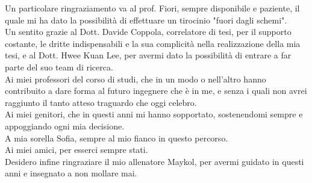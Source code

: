 \documentclass[a4print,english,lof,lot,twoside]{univpmthesis}
\begin{document}
 

\frontmatter

\maketitle

\begin{thesisacknowledge}[italian]Un particolare ringraziamento va al prof. Fiori, sempre disponibile e paziente, il quale mi ha dato la possibilità di effettuare un tirocinio "fuori dagli schemi". \\
Un sentito grazie al Dott. Davide Coppola, correlatore di tesi, per il supporto costante, le dritte indispensabili e la sua complicità nella realizzazione della mia tesi, e al Dott. Hwee Kuan Lee, per avermi dato la possibilità di entrare a far parte del suo team di ricerca.\\
Ai miei professori del corso di studi, che in un modo o nell'altro hanno contribuito a dare forma al futuro ingegnere che è in me, e senza i quali non avrei raggiunto il tanto atteso traguardo che oggi celebro.\\
Ai miei genitori, che in questi anni mi hanno sopportato, sostenendomi sempre e appoggiando ogni mia decisione. \\
A mia sorella Sofia, sempre al mio fianco in questo percorso. \\
Ai miei amici, per esserci sempre stati. \\
Desidero infine ringraziare il mio allenatore Maykol, per avermi guidato in questi anni e insegnato a non mollare mai.
\end{thesisacknowledge}
\end{document}
